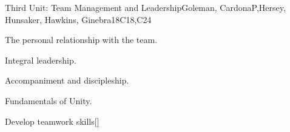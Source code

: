 \begin{syllabus}
\begin{unit}{}{Third Unit: Team Management and Leadership}{Goleman, CardonaP,Hersey, Hunsaker, Hawkins, Ginebra}{18}{C18,C24}
\begin{topics}
	\item The personal relationship with the team.
	\item Integral leadership.
	\item Accompaniment and discipleship.
	\item Fundamentals of Unity.
\end{topics}
\begin{learningoutcomes}
	\item Develop teamwork skills[\Familiarity]
\end{learningoutcomes}
\end{unit}

\begin{coursebibliography}
\end{coursebibliography}

\end{syllabus}
